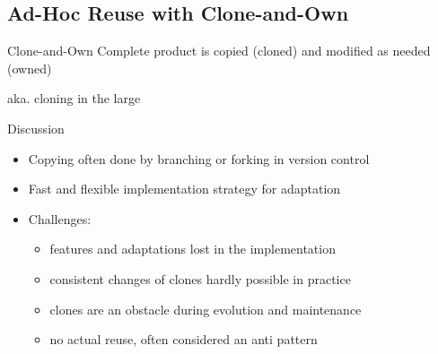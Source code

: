 \subsection{Ad-Hoc Reuse with Clone-and-Own}
\begin{frame}{\insertsubsection}
	\centering\trunkbranch{}{}
	\begin{fancycolumns}[T,widths={30}]
		\begin{definition}{Clone-and-Own}
			Complete product is copied (cloned) and modified as needed (owned)
			
			aka. cloning in the large
		\end{definition}
	\nextcolumn
		\begin{note}{Discussion}
				\begin{itemize}
					\item Copying often done by branching or forking in version control
					\item Fast and flexible implementation strategy for adaptation
					\item Challenges:
					\begin{itemize}
						\item features and adaptations lost in the implementation
						\item consistent changes of clones hardly possible in practice
						\item clones are an obstacle during evolution and maintenance
						\item no actual reuse, often considered an anti pattern
					\end{itemize}
				\end{itemize}
		\end{note}
	\end{fancycolumns}
\end{frame}
